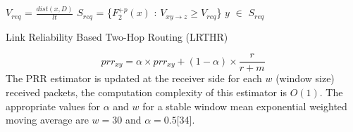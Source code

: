 \documentclass[fleqn,twoside]{article}
\begin{document}
\begin{algorithm}
\begin{footnotesize}
\BlankLine


$V_{req}$ = $\frac{dist(x,D)}{lt}$ \;
$S_{req}$ = \{$F_2^{+p}(x)$ : $V_{xy\rightarrow z} \geq V_{req}$\} \;
	\Return $y$ $\in$ $S_{req}$\;
\caption{Link Reliability Based Two-Hop Routing (LRTHR)}
\label{algo:lr2halgo}
\end{footnotesize}
\end{algorithm}


\begin{equation}
prr_{xy} = \alpha \times prr_{xy} + (1-\alpha) \times \frac{r}{r+m} 
\label{eqn:Eq1}
\end{equation}
The PRR estimator is updated at the receiver side for each $w$ (window size) received packets, the computation complexity of
this estimator is $O(1)$. The appropriate values for $\alpha$ and $w$ for a stable window mean exponential weighted moving average are $w=30$ and $\alpha=0.5$[34].
\end{document}
